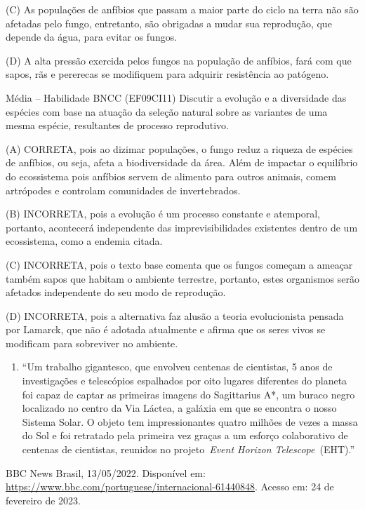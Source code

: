 (C) As populações de anfíbios que passam a maior parte do ciclo na terra
não são afetadas pelo fungo, entretanto, são obrigadas a mudar sua
reprodução, que depende da água, para evitar os fungos.

(D) A alta pressão exercida pelos fungos na população de anfíbios, fará
com que sapos, rãs e pererecas se modifiquem para adquirir resistência
ao patógeno.

Média -- Habilidade BNCC (EF09CI11) Discutir a evolução e a diversidade
das espécies com base na atuação da seleção natural sobre as variantes
de uma mesma espécie, resultantes de processo reprodutivo.

(A) CORRETA, pois ao dizimar populações, o fungo reduz a riqueza de
espécies de anfíbios, ou seja, afeta a biodiversidade da área. Além de
impactar o equilíbrio do ecossistema pois anfíbios servem de alimento
para outros animais, comem artrópodes e controlam comunidades de
invertebrados.

(B) INCORRETA, pois a evolução é um processo constante e atemporal,
portanto, acontecerá independente das imprevisibilidades existentes
dentro de um ecossistema, como a endemia citada.

(C) INCORRETA, pois o texto base comenta que os fungos começam a ameaçar
também sapos que habitam o ambiente terrestre, portanto, estes
organismos serão afetados independente do seu modo de reprodução.

(D) INCORRETA, pois a alternativa faz alusão a teoria evolucionista
pensada por Lamarck, que não é adotada atualmente e afirma que os seres
vivos se modificam para sobreviver no ambiente.

\begin{enumerate}
\def\labelenumi{\arabic{enumi})}
\item
  ``Um trabalho gigantesco, que envolveu centenas de cientistas, 5 anos
  de investigações e telescópios espalhados por oito lugares diferentes
  do planeta foi capaz de captar as primeiras imagens do Sagittarius A*,
  um buraco negro localizado no centro da Via Láctea, a galáxia em que
  se encontra o nosso Sistema Solar. O objeto tem impressionantes quatro
  milhões de vezes a massa do Sol e foi retratado pela primeira vez
  graças a um esforço colaborativo de centenas de cientistas, reunidos
  no projeto~\emph{Event Horizon Telescope}~(EHT).''
\end{enumerate}

BBC News Brasil, 13/05/2022. Disponível em:
\url{https://www.bbc.com/portuguese/internacional-61440848}. Acesso em:
24 de fevereiro de 2023.

